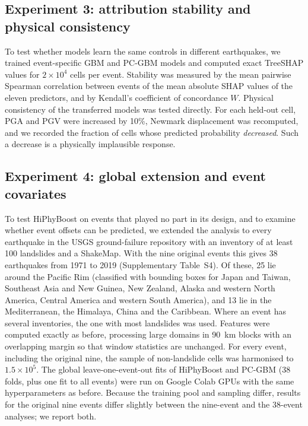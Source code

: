 \subsection{Experiment 3: attribution stability and physical consistency}
To test whether models learn the same controls in different earthquakes, we trained event-specific GBM and PC-GBM models and computed exact TreeSHAP values \citep{lundberg2020} for $2\times10^4$ cells per event. Stability was measured by the mean pairwise Spearman correlation between events of the mean absolute SHAP values of the eleven predictors, and by Kendall's coefficient of concordance $W$. Physical consistency of the transferred models was tested directly. For each held-out cell, PGA and PGV were increased by 10\%, Newmark displacement was recomputed, and we recorded the fraction of cells whose predicted probability \emph{decreased}. Such a decrease is a physically implausible response.

\subsection{Experiment 4: global extension and event covariates}\label{sec:meth_global}
To test HiPhyBoost on events that played no part in its design, and to examine whether event offsets can be predicted, we extended the analysis to every earthquake in the USGS ground-failure repository \citep{schmitt2017} with an inventory of at least 100 landslides and a ShakeMap. With the nine original events this gives 38 earthquakes from 1971 to 2019 (Supplementary Table~S4). Of these, 25 lie around the Pacific Rim (classified with bounding boxes for Japan and Taiwan, Southeast Asia and New Guinea, New Zealand, Alaska and western North America, Central America and western South America), and 13 lie in the Mediterranean, the Himalaya, China and the Caribbean. Where an event has several inventories, the one with most landslides was used. Features were computed exactly as before, processing large domains in 90~km blocks with an overlapping margin so that window statistics are unchanged. For every event, including the original nine, the sample of non-landslide cells was harmonised to $1.5\times10^5$. The global leave-one-event-out fits of HiPhyBoost and PC-GBM (38 folds, plus one fit to all events) were run on Google Colab GPUs with the same hyperparameters as before. Because the training pool and sampling differ, results for the original nine events differ slightly between the nine-event and the 38-event analyses; we report both.

